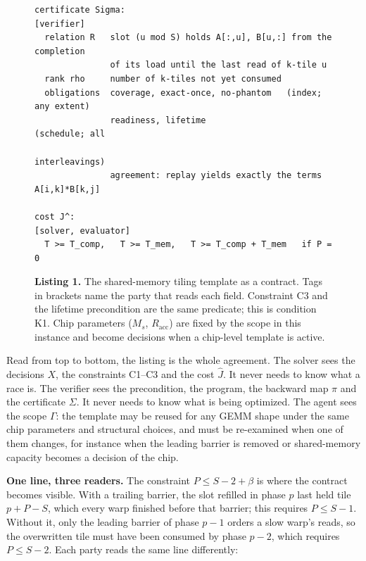\documentclass[11pt]{article}
\begin{document}
\begin{figure}[tp]
\begin{framed}
\begin{verbatim}
certificate Sigma:                                                [verifier]
  relation R   slot (u mod S) holds A[:,u], B[u,:] from the completion
               of its load until the last read of k-tile u
  rank rho     number of k-tiles not yet consumed
  obligations  coverage, exact-once, no-phantom   (index; any extent)
               readiness, lifetime                (schedule; all
                                                   interleavings)
               agreement: replay yields exactly the terms A[i,k]*B[k,j]

cost J^:                                                 [solver, evaluator]
  T >= T_comp,   T >= T_mem,   T >= T_comp + T_mem   if P = 0
\end{verbatim}
\end{framed}
\vspace{-0.6em}
{\small\textbf{Listing 1.} The shared-memory tiling template as a contract. Tags in brackets name the party that reads each field. Constraint C3 and the lifetime precondition are the same predicate; this is condition K1. Chip parameters ($M_s$, $R_{\mathrm{acc}}$) are fixed by the scope in this instance and become decisions when a chip-level template is active.}
\end{figure}

Read from top to bottom, the listing is the whole agreement. The solver sees the decisions \(X\), the constraints C1--C3 and the cost \(\hat J\). It never needs to know what a race is. The verifier sees the precondition, the program, the backward map \(\pi\) and the certificate \(\Sigma\). It never needs to know what is being optimized. The agent sees the scope \(\Gamma\): the template may be reused for any GEMM shape under the same chip parameters and structural choices, and must be re-examined when one of them changes, for instance when the leading barrier is removed or shared-memory capacity becomes a decision of the chip.

\textbf{One line, three readers.} The constraint \(P\le S-2+\beta\) is where the contract becomes visible. With a trailing barrier, the slot refilled in phase \(p\) last held tile \(p+P-S\), which every warp finished before that barrier; this requires \(P\le S-1\). Without it, only the leading barrier of phase \(p-1\) orders a slow warp's reads, so the overwritten tile must have been consumed by phase \(p-2\), which requires \(P\le S-2\). Each party reads the same line differently:
\end{document}
